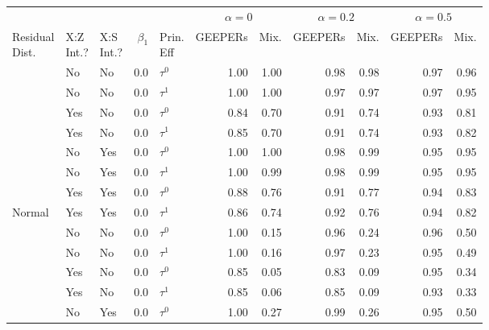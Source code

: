 
\begin{tabular}[t]{lllrlrrrrrr}
\toprule
\multicolumn{5}{c}{ } & \multicolumn{2}{c}{$\alpha=0$} & \multicolumn{2}{c}{$\alpha=0.2$} & \multicolumn{2}{c}{$\alpha=0.5$} \\
\cmidrule(l{3pt}r{3pt}){6-7} \cmidrule(l{3pt}r{3pt}){8-9} \cmidrule(l{3pt}r{3pt}){10-11}
\makecell[l]{Residual\\Dist.} & \makecell[l]{X:Z\\Int.?} & \makecell[l]{X:S\\Int.?} & $\beta_1$ & \makecell[l]{Prin.\\Eff} & GEEPERs & Mix. & GEEPERs & Mix. & GEEPERs & Mix.\\
\midrule
 & No & No & 0.0 & $\tau^0$ & 1.00 & 1.00 & 0.98 & 0.98 & 0.97 & 0.96\\

 & No & No & 0.0 & $\tau^1$ & 1.00 & 1.00 & 0.97 & 0.97 & 0.97 & 0.95\\

 & Yes & No & 0.0 & $\tau^0$ & 0.84 & 0.70 & 0.91 & 0.74 & 0.93 & 0.81\\

 & Yes & No & 0.0 & $\tau^1$ & 0.85 & 0.70 & 0.91 & 0.74 & 0.93 & 0.82\\

 & No & Yes & 0.0 & $\tau^0$ & 1.00 & 1.00 & 0.98 & 0.99 & 0.95 & 0.95\\

 & No & Yes & 0.0 & $\tau^1$ & 1.00 & 0.99 & 0.98 & 0.99 & 0.95 & 0.95\\

 & Yes & Yes & 0.0 & $\tau^0$ & 0.88 & 0.76 & 0.91 & 0.77 & 0.94 & 0.83\\

\multirow{-8}{*}{\raggedright\arraybackslash Normal} & Yes & Yes & 0.0 & $\tau^1$ & 0.86 & 0.74 & 0.92 & 0.76 & 0.94 & 0.82\\
\cmidrule{1-11}
 & No & No & 0.0 & $\tau^0$ & 1.00 & 0.15 & 0.96 & 0.24 & 0.96 & 0.50\\

 & No & No & 0.0 & $\tau^1$ & 1.00 & 0.16 & 0.97 & 0.23 & 0.95 & 0.49\\

 & Yes & No & 0.0 & $\tau^0$ & 0.85 & 0.05 & 0.83 & 0.09 & 0.95 & 0.34\\

 & Yes & No & 0.0 & $\tau^1$ & 0.85 & 0.06 & 0.85 & 0.09 & 0.93 & 0.33\\

 & No & Yes & 0.0 & $\tau^0$ & 1.00 & 0.27 & 0.99 & 0.26 & 0.95 & 0.50\\


\end{tabular}
